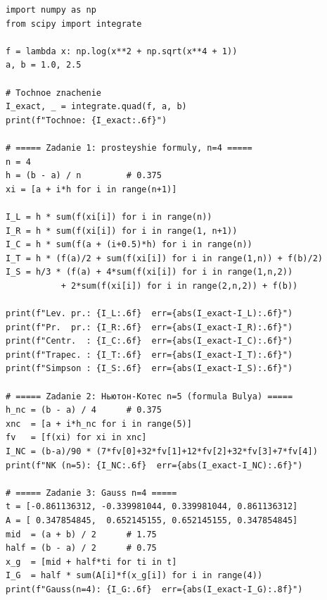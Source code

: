 \documentclass[a4paper, final]{article}
\begin{document}
\begin{lstlisting}[caption={Численное интегрирование (Python)}, label=lst:code]
import numpy as np
from scipy import integrate

f = lambda x: np.log(x**2 + np.sqrt(x**4 + 1))
a, b = 1.0, 2.5

# Tochnoe znachenie
I_exact, _ = integrate.quad(f, a, b)
print(f"Tochnoe: {I_exact:.6f}")

# ===== Zadanie 1: prosteyshie formuly, n=4 =====
n = 4
h = (b - a) / n         # 0.375
xi = [a + i*h for i in range(n+1)]

I_L = h * sum(f(xi[i]) for i in range(n))
I_R = h * sum(f(xi[i]) for i in range(1, n+1))
I_C = h * sum(f(a + (i+0.5)*h) for i in range(n))
I_T = h * (f(a)/2 + sum(f(xi[i]) for i in range(1,n)) + f(b)/2)
I_S = h/3 * (f(a) + 4*sum(f(xi[i]) for i in range(1,n,2))
           + 2*sum(f(xi[i]) for i in range(2,n,2)) + f(b))

print(f"Lev. pr.: {I_L:.6f}  err={abs(I_exact-I_L):.6f}")
print(f"Pr.  pr.: {I_R:.6f}  err={abs(I_exact-I_R):.6f}")
print(f"Centr.  : {I_C:.6f}  err={abs(I_exact-I_C):.6f}")
print(f"Trapec. : {I_T:.6f}  err={abs(I_exact-I_T):.6f}")
print(f"Simpson : {I_S:.6f}  err={abs(I_exact-I_S):.6f}")

# ===== Zadanie 2: Ньютон-Котес n=5 (formula Bulya) =====
h_nc = (b - a) / 4      # 0.375
xnc  = [a + i*h_nc for i in range(5)]
fv   = [f(xi) for xi in xnc]
I_NC = (b-a)/90 * (7*fv[0]+32*fv[1]+12*fv[2]+32*fv[3]+7*fv[4])
print(f"NK (n=5): {I_NC:.6f}  err={abs(I_exact-I_NC):.6f}")

# ===== Zadanie 3: Gauss n=4 =====
t = [-0.861136312, -0.339981044, 0.339981044, 0.861136312]
A = [ 0.347854845,  0.652145155, 0.652145155, 0.347854845]
mid  = (a + b) / 2      # 1.75
half = (b - a) / 2      # 0.75
x_g  = [mid + half*ti for ti in t]
I_G  = half * sum(A[i]*f(x_g[i]) for i in range(4))
print(f"Gauss(n=4): {I_G:.6f}  err={abs(I_exact-I_G):.8f}")
\end{lstlisting}
\end{document}
